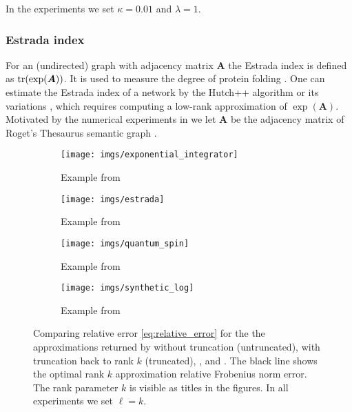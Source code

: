 In the experiments we set $\kappa = 0.01$ and $\lambda = 1$. 
\subsubsection{Estrada index}\label{section:estrada}
For an (undirected) graph with adjacency matrix $\bm{A}$ the Estrada index is defined as $\operatorname{tr}(\exp(\bm{A}))$. It is used to measure the degree of protein folding \cite{estrada}. One can estimate the Estrada index of a network by the Hutch++ algorithm or its variations \cite{chen_hallman_23,epperly2023xtrace,hpp,ahpp}, which requires computing a low-rank approximation of $\exp(\bm{A})$. Motivated by the numerical experiments in \cite{hpp} we let $\bm{A}$ be the adjacency matrix of Roget’s Thesaurus semantic graph \cite{roget}. 

\begin{figure}[ht]
\begin{subfigure}{.5\textwidth}
  \centering
  \texttt{[image: imgs/exponential\_integrator]}  
  \caption{Example from }
\end{subfigure}
\begin{subfigure}{.5\textwidth}
  \centering
  \texttt{[image: imgs/estrada]} 
  \caption{Example from }
\end{subfigure}
\begin{subfigure}{.5\textwidth}
  \centering
  \texttt{[image: imgs/quantum\_spin]}  
  \caption{Example from }
\end{subfigure}
\begin{subfigure}{.5\textwidth}
  \centering
  \texttt{[image: imgs/synthetic\_log]}  
  \caption{Example from }
\end{subfigure}
\caption{Comparing relative error \eqref{eq:relative_error} for the the approximations returned by  without truncation (untruncated),  with truncation back to rank $k$ (truncated), , and . The black line shows the optimal rank $k$ approximation relative Frobenius norm error. The rank parameter $k$ is visible as titles in the figures. In all experiments we set $\ell = k$. }
\label{fig:relative_errors}
\end{figure}


